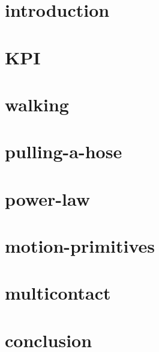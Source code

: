 \documentclass{beamer}
\begin{document}
\begin{frame}{}
  \titlepage
\end{frame}

\section{introduction}
\setcounter{subsection}{1}

\section{KPI}
\setcounter{subsection}{2}

\section{walking}
\setcounter{subsection}{3}

\section{pulling-a-hose}
\setcounter{subsection}{4}

\section{power-law}
\setcounter{subsection}{5}

\section{motion-primitives}
\setcounter{subsection}{6}

\section{multicontact}
\setcounter{subsection}{7}

\section{conclusion}
\setcounter{subsection}{8}
\end{document}
